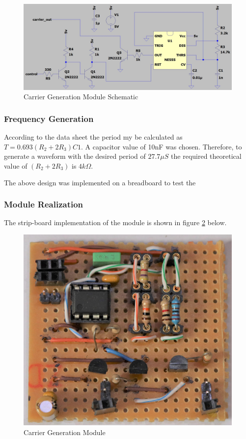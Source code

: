 \begin{figure}[H]
	\centering
	\includegraphics[width=.8\textwidth]{figures/design/carrier_waveform_generator_555.JPG}
	\caption{Carrier Generation Module Schematic}
	\label{fig:schematic_carrier_generation}
\end{figure}

\subsubsection{Frequency Generation}

According to the data sheet the period my be calculated as \(T = 0.693 (R_2 + 2R_3) C1\). A capacitor value of 10nF was chosen. Therefore, to generate a waveform with the desired period of $27.7\mu S$ the required theoretical value of $(R_2 + 2R_3)$ is $4k\Omega$.

The above design was implemented on a breadboard to test the

\subsubsection{Module Realization}
The strip-board implementation of the module is shown in figure \ref{fig:module_carrier_generation} below.

\begin{figure}[H]
	\centering
	\includegraphics[width=.6\textwidth]{figures/modules/carrier_generator.jpg}
	\caption{Carrier Generation Module}
	\label{fig:module_carrier_generation}
\end{figure}



